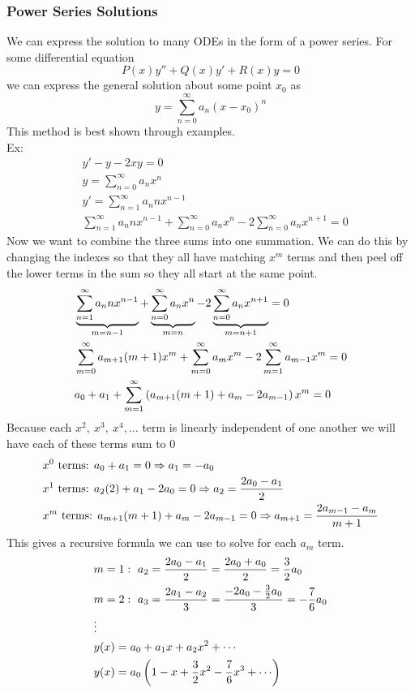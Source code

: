 \documentclass[11pt, fleqn]{article}
\begin{document}
\subsubsection{Power Series Solutions}
We can express the solution to many ODEs in the form of a power series. For some differential equation
$$P(x)y''+Q(x)y'+R(x)y=0$$
we can express the general solution about some point $x_0$ as
$$y=\sum_{n=0}^\infty a_n(x-x_0)^n$$
This method is best shown through examples.\\
Ex:
\begin{align*}
    &y'-y-2xy=0\\
    &y=\sum_{n=0}^\infty a_nx^n\\
    &y'=\sum_{n=1}^\infty a_n nx^{n-1}\\
    &\sum_{n=1}^\infty a_nnx^{n-1}+\sum_{n=0}^\infty a_nx^n-2\sum_{n=0}^\infty a_nx^{n+1}=0
\end{align*}
Now we want to combine the three sums into one summation. We can do this by changing the indexes so that they all have matching $x^m$ terms and then peel off the lower terms in the sum so they all start at the same point.
\begin{align*}
    &\underbrace{\sum_{n=1}^\infty a_nnx^{n-1}}_{m=n-1}+\underbrace{\sum_{n=0}^\infty a_nx^n}_{m=n}-2\underbrace{\sum_{n=0}^\infty a_nx^{n+1}}_{m=n+1}=0\\
    &\sum_{m=0}^\infty a_{m+1}(m+1)x^m+\sum_{m=0}^\infty a_mx^m-2\sum_{m=1}^\infty a_{m-1}x^m=0\\
    &a_0+a_1+\sum_{m=1}^\infty\left( a_{m+1}(m+1)+a_m-2a_{m-1} \right)x^m=0
\end{align*}
Because each $x^2,\ x^3,\ x^4,\ldots$ term is linearly independent of one another we will have each of these terms sum to 0
\begin{align*}
    &x^0\text{ terms: }a_0+a_1=0\Rightarrow a_1=-a_0\\
    &x^1\text{ terms: }a_2(2)+a_1-2a_0=0\Rightarrow a_2=\frac{2a_0-a_1}{2}\\
    &x^m\text{ terms: }a_{m+1}(m+1)+a_m-2a_{m-1}=0\Rightarrow a_{m+1}=\frac{2a_{m-1}-a_m}{m+1}
\end{align*}
This gives a recursive formula we can use to solve for each $a_m$ term.
\begin{align*}
    &m=1:\ a_2=\frac{2a_0-a_1}{2}=\frac{2a_0+a_0}{2}=\frac{3}{2}a_0\\
    &m=2:\ a_3=\frac{2a_1-a_2}{3}=\frac{-2a_0-\frac{3}{2}a_0}{3}=-\frac{7}{6}a_0\\
    &\vdots\\
    &y(x)=a_0+a_1x+a_2x^2+\cdots\\
    &y(x)=a_0\brround{1-x+\frac{3}{2}x^2-\frac{7}{6}x^3+\cdots}
\end{align*}
\end{document}
